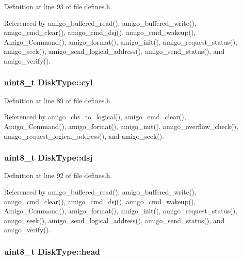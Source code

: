 Definition at line 93 of file defines.\-h.



Referenced by amigo\-\_\-buffered\-\_\-read(), amigo\-\_\-buffered\-\_\-write(), amigo\-\_\-cmd\-\_\-clear(), amigo\-\_\-cmd\-\_\-dsj(), amigo\-\_\-cmd\-\_\-wakeup(), Amigo\-\_\-\-Command(), amigo\-\_\-format(), amigo\-\_\-init(), amigo\-\_\-request\-\_\-status(), amigo\-\_\-seek(), amigo\-\_\-send\-\_\-logical\-\_\-address(), amigo\-\_\-send\-\_\-status(), and amigo\-\_\-verify().

\hypertarget{structDiskType_a990d2a05bc2d8bf1328d0249202539e5}{
\subsubsection[{cyl}]{\setlength{\rightskip}{0pt plus 5cm}uint8\-\_\-t Disk\-Type\-::cyl}}\label{structDiskType_a990d2a05bc2d8bf1328d0249202539e5}


Definition at line 89 of file defines.\-h.



Referenced by amigo\-\_\-chs\-\_\-to\-\_\-logical(), amigo\-\_\-cmd\-\_\-clear(), Amigo\-\_\-\-Command(), amigo\-\_\-format(), amigo\-\_\-init(), amigo\-\_\-overflow\-\_\-check(), amigo\-\_\-request\-\_\-logical\-\_\-address(), and amigo\-\_\-seek().

\hypertarget{structDiskType_ad89ac2f4b87d861ae4ca3f185868b7da}{
\subsubsection[{dsj}]{\setlength{\rightskip}{0pt plus 5cm}uint8\-\_\-t Disk\-Type\-::dsj}}\label{structDiskType_ad89ac2f4b87d861ae4ca3f185868b7da}


Definition at line 92 of file defines.\-h.



Referenced by amigo\-\_\-buffered\-\_\-read(), amigo\-\_\-buffered\-\_\-write(), amigo\-\_\-cmd\-\_\-clear(), amigo\-\_\-cmd\-\_\-dsj(), amigo\-\_\-cmd\-\_\-wakeup(), Amigo\-\_\-\-Command(), amigo\-\_\-format(), amigo\-\_\-init(), amigo\-\_\-request\-\_\-status(), amigo\-\_\-seek(), amigo\-\_\-send\-\_\-logical\-\_\-address(), amigo\-\_\-send\-\_\-status(), and amigo\-\_\-verify().

\hypertarget{structDiskType_ac4cc3cfd8e1fd4d6ec9dded35384786f}{
\subsubsection[{head}]{\setlength{\rightskip}{0pt plus 5cm}uint8\-\_\-t Disk\-Type\-::head}}\label{structDiskType_ac4cc3cfd8e1fd4d6ec9dded35384786f}


